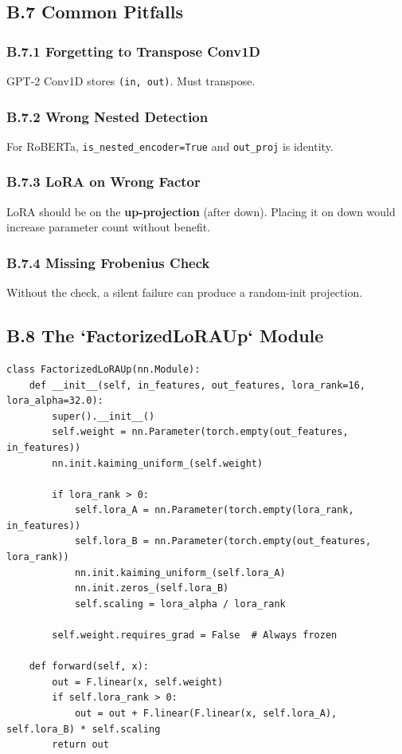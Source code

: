 \subsection{B.7 Common Pitfalls}

\subsubsection{B.7.1 Forgetting to Transpose Conv1D}

GPT-2 Conv1D stores \texttt{(in, out)}. Must transpose.

\subsubsection{B.7.2 Wrong Nested Detection}

For RoBERTa, \texttt{is\_nested\_encoder=True} and \texttt{out\_proj} is identity.

\subsubsection{B.7.3 LoRA on Wrong Factor}

LoRA should be on the \textbf{up-projection} (after down). Placing it on down 
would increase parameter count without benefit.

\subsubsection{B.7.4 Missing Frobenius Check}

Without the check, a silent failure can produce a random-init projection.

\subsection{B.8 The `FactorizedLoRAUp` Module}

\begin{lstlisting}
class FactorizedLoRAUp(nn.Module):
    def __init__(self, in_features, out_features, lora_rank=16, lora_alpha=32.0):
        super().__init__()
        self.weight = nn.Parameter(torch.empty(out_features, in_features))
        nn.init.kaiming_uniform_(self.weight)
        
        if lora_rank > 0:
            self.lora_A = nn.Parameter(torch.empty(lora_rank, in_features))
            self.lora_B = nn.Parameter(torch.empty(out_features, lora_rank))
            nn.init.kaiming_uniform_(self.lora_A)
            nn.init.zeros_(self.lora_B)
            self.scaling = lora_alpha / lora_rank
        
        self.weight.requires_grad = False  # Always frozen
    
    def forward(self, x):
        out = F.linear(x, self.weight)
        if self.lora_rank > 0:
            out = out + F.linear(F.linear(x, self.lora_A), self.lora_B) * self.scaling
        return out
\end{lstlisting}

